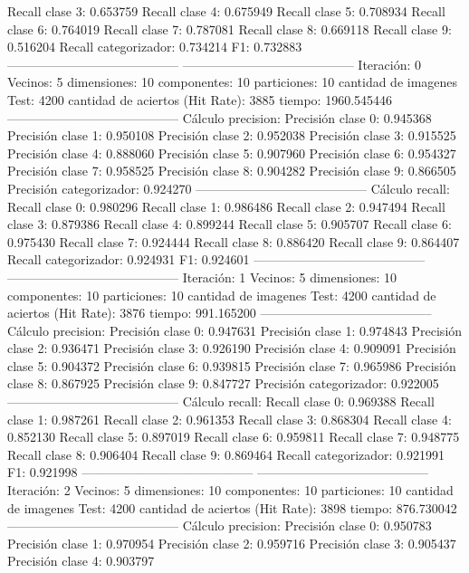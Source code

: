 Recall clase 3: 0.653759
Recall clase 4: 0.675949
Recall clase 5: 0.708934
Recall clase 6: 0.764019
Recall clase 7: 0.787081
Recall clase 8: 0.669118
Recall clase 9: 0.516204
Recall categorizador: 0.734214
F1: 0.732883
-----------------------------------------
-----------------------------------------
Iteración: 0
Vecinos: 5
dimensiones: 10
componentes: 10
particiones: 10
cantidad de imagenes Test: 4200
cantidad de aciertos (Hit Rate): 3885
tiempo: 1960.545446
-----------------------------------------
Cálculo precision: 
Precisión clase 0: 0.945368
Precisión clase 1: 0.950108
Precisión clase 2: 0.952038
Precisión clase 3: 0.915525
Precisión clase 4: 0.888060
Precisión clase 5: 0.907960
Precisión clase 6: 0.954327
Precisión clase 7: 0.958525
Precisión clase 8: 0.904282
Precisión clase 9: 0.866505
Precisión categorizador: 0.924270
-----------------------------------------
Cálculo recall: 
Recall clase 0: 0.980296
Recall clase 1: 0.986486
Recall clase 2: 0.947494
Recall clase 3: 0.879386
Recall clase 4: 0.899244
Recall clase 5: 0.905707
Recall clase 6: 0.975430
Recall clase 7: 0.924444
Recall clase 8: 0.886420
Recall clase 9: 0.864407
Recall categorizador: 0.924931
F1: 0.924601
-----------------------------------------
-----------------------------------------
Iteración: 1
Vecinos: 5
dimensiones: 10
componentes: 10
particiones: 10
cantidad de imagenes Test: 4200
cantidad de aciertos (Hit Rate): 3876
tiempo: 991.165200
-----------------------------------------
Cálculo precision: 
Precisión clase 0: 0.947631
Precisión clase 1: 0.974843
Precisión clase 2: 0.936471
Precisión clase 3: 0.926190
Precisión clase 4: 0.909091
Precisión clase 5: 0.904372
Precisión clase 6: 0.939815
Precisión clase 7: 0.965986
Precisión clase 8: 0.867925
Precisión clase 9: 0.847727
Precisión categorizador: 0.922005
-----------------------------------------
Cálculo recall: 
Recall clase 0: 0.969388
Recall clase 1: 0.987261
Recall clase 2: 0.961353
Recall clase 3: 0.868304
Recall clase 4: 0.852130
Recall clase 5: 0.897019
Recall clase 6: 0.959811
Recall clase 7: 0.948775
Recall clase 8: 0.906404
Recall clase 9: 0.869464
Recall categorizador: 0.921991
F1: 0.921998
-----------------------------------------
-----------------------------------------
Iteración: 2
Vecinos: 5
dimensiones: 10
componentes: 10
particiones: 10
cantidad de imagenes Test: 4200
cantidad de aciertos (Hit Rate): 3898
tiempo: 876.730042
-----------------------------------------
Cálculo precision: 
Precisión clase 0: 0.950783
Precisión clase 1: 0.970954
Precisión clase 2: 0.959716
Precisión clase 3: 0.905437
Precisión clase 4: 0.903797
